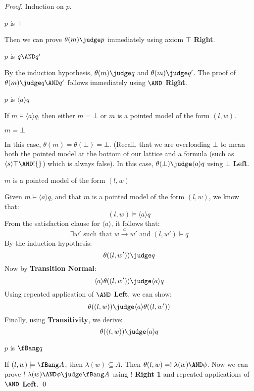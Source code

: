 \begin{proof}
Induction on $p$.
\setcounter{mycase}{0}

\begin{mycase}
$p$ is $\top$
\end{mycase}
Then we can prove  $\theta(m) \judge p$ immediately using axiom {\bf $\top$ Right}.

\begin{mycase}
$p$ is $q \AND q'$
\end{mycase}
By the induction hypothesis, $\theta(m) \judge q$ and $\theta(m) \judge q'$.
The proof of $\theta(m) \judge q \AND q'$ follows immediately using {\bf $\AND$ Right}.

\begin{mycase}
$p$ is $\langle a \rangle q$
\end{mycase}
If $m \models \langle a \rangle q$, then either $m = \bot$ or $m$ is a pointed model of the form $(l,w)$.
\begin{subcase}
$m = \bot$
\end{subcase}
In this case, $\theta(m) = \theta(\bot) = \bot$. (Recall, that we are overloading $\bot$ to mean both the pointed model at the bottom of our lattice and a formula (such as $\langle s \rangle \top \AND !\{\}$) which is always false).
In this case, $ \theta(\bot) \judge  \langle a \rangle q$ using {\bf $\bot$ Left}.

\begin{subcase}
 $m$ is a pointed model of the form $(l,w)$
 \end{subcase}
Given $m \models \langle a \rangle q$, and that $m$ is a pointed model of the form $(l,w)$, we know that:
\[
(l,w) \models \langle a \rangle q
\]
From the satisfaction clause for $\langle a \rangle$, it follows that:
\[
\exists w' \mbox{ such that } w \xrightarrow{a} w' \mbox { and } (l,w') \models q
\]
By the induction hypothesis:
\[
\theta( (l,w') ) \judge q
\]
Now by {\bf Transition Normal}:
\[
\langle a \rangle \theta( (l,w') ) \judge \langle a \rangle q
\]
Using repeated application of {\bf $\AND$ Left}, we can show:
\[
\theta((l,w)) \judge \langle a \rangle \theta((l,w'))
\]
Finally, using {\bf Transitivity}, we derive:
\[
\theta((l,w)) \judge  \langle a \rangle q
\]
\begin{mycase}
$p$ is $\fBang q$
\end{mycase}
If $(l,w) \models \fBang A$, then $\lambda(w) \subseteq A$.
Then $\theta(l,w) = ! \; \lambda(w) \AND \phi$.
Now we can prove $! \; \lambda(w) \AND \phi \judge \fBang A$ using  {\bf $!$ Right 1} and repeated applications of {\bf $\AND$ Left}.
\qed
\end{proof}

